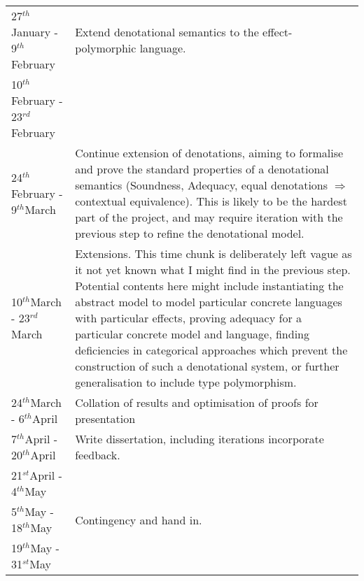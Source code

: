 \documentclass[11pt]{article}
\newcommand{\st}{$^{st}$}
\renewcommand{\th}{$^{th}$}
\newcommand{\rd}{$^{rd}$}
\begin{document}
\begin{tabular}{|p{6cm}||p{10cm}|}
	27\th January - 9\th February &  Extend denotational semantics to the effect-polymorphic language.
	\\\cline{1-1}
	10\th February - 23\rd February &  \\\hline
	24\th February - 9\th March & Continue extension of denotations, aiming to formalise and prove the standard properties of a denotational semantics (Soundness, Adequacy, equal denotations $\Rightarrow$ contextual equivalence). This is likely to be the hardest part of the project, and may require iteration with the previous step to refine the denotational model. \\\hline
	10\th March - 23\rd March & Extensions. This time chunk is deliberately left vague as it not yet known what I might find in the previous step. Potential contents here might include instantiating the abstract model to model particular concrete languages with particular effects, proving adequacy for a particular concrete model and language, finding deficiencies in categorical approaches which prevent the construction of such a denotational system, or further generalisation to include type polymorphism. \\\hline
	24\th March - 6\th April & Collation of results and optimisation of proofs for presentation \\\hline
	7\th April - 20\th April & Write dissertation, including iterations incorporate feedback. \\\cline{1-1}
	21\st April - 4\th May &\\\hline
	5\th May - 18\th May & Contingency and hand in.\\\cline{1-1}
	19\th May - 31\st May & \\
\hline
\end{tabular}

\newpage
\appendix
\end{document}
